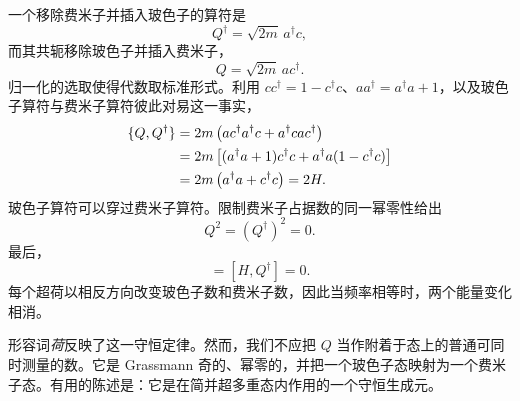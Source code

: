 一个移除费米子并插入玻色子的算符是
\begin{equation}
Q^\dagger=\sqrt{2m}\,a^\dagger c,
\end{equation}
而其共轭移除玻色子并插入费米子，
\begin{equation}
Q=\sqrt{2m}\,a c^\dagger.
\end{equation}
归一化的选取使得代数取标准形式。利用 \(cc^\dagger=1-c^\dagger c\)、\(aa^\dagger=a^\dagger a+1\)，以及玻色子算符与费米子算符彼此对易这一事实，
\begin{align}
\{Q,Q^\dagger\}
&=2m\left(ac^\dagger a^\dagger c+a^\dagger c a c^\dagger\right)\notag\\
&=2m\left[(a^\dagger a+1)c^\dagger c
+a^\dagger a(1-c^\dagger c)\right]\notag\\
&=2m\left(a^\dagger a+c^\dagger c\right)=2H.
\label{eq:l7-superalgebra}
\end{align}
玻色子算符可以穿过费米子算符。限制费米子占据数的同一幂零性给出
\begin{equation}
Q^2=(Q^\dagger)^2=0.
\end{equation}
最后，
\begin{equation}
[H,Q]=[H,Q^\dagger]=0.
\label{eq:l7-conserved-supercharges}
\end{equation}
每个超荷以相反方向改变玻色子数和费米子数，因此当频率相等时，两个能量变化相消。

\begin{classroomqa}
\end{classroomqa}

\begin{classroomqa}
\end{classroomqa}

形容词\emph{荷}反映了这一守恒定律。然而，我们不应把 \(Q\) 当作附着于态上的普通可同时测量的数。它是 Grassmann 奇的、幂零的，并把一个玻色子态映射为一个费米子态。有用的陈述是：它是在简并超多重态内作用的一个守恒生成元。

